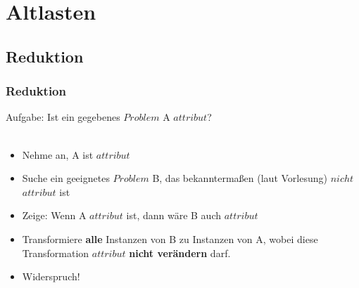 




\section{Altlasten}
\subsection{Reduktion}

\begin{frame}
\frametitle{Reduktion}
Aufgabe: Ist ein gegebenes $Problem$ A $attribut$?~\\~\\
\begin{itemize}
\item Nehme an, A ist $attribut$
\item Suche ein geeignetes $Problem$ B, das bekanntermaßen (laut Vorlesung) $nicht$ $attribut$ ist
\item Zeige: Wenn A $attribut$ ist, dann wäre B auch $attribut$
\item Transformiere \textbf{alle} Instanzen von B zu Instanzen von A, wobei diese Transformation $attribut$ \textbf{nicht verändern} darf.
\item Widerspruch!
\end{itemize}
\end{frame}

